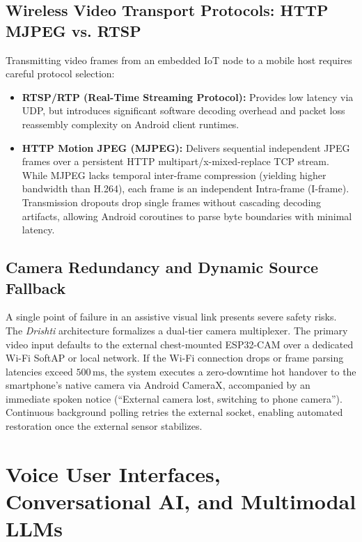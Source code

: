 \documentclass[10pt,twocolumn]{article}
\begin{document}
\subsection{Wireless Video Transport Protocols: HTTP MJPEG vs. RTSP}
Transmitting video frames from an embedded IoT node to a mobile host requires careful protocol selection:
\begin{itemize}[leftmargin=*]
    \item \textbf{RTSP/RTP (Real-Time Streaming Protocol):} Provides low latency via UDP, but introduces significant software decoding overhead and packet loss reassembly complexity on Android client runtimes.
    \item \textbf{HTTP Motion JPEG (MJPEG):} Delivers sequential independent JPEG frames over a persistent HTTP multipart/x-mixed-replace TCP stream. While MJPEG lacks temporal inter-frame compression (yielding higher bandwidth than H.264), each frame is an independent Intra-frame (I-frame). Transmission dropouts drop single frames without cascading decoding artifacts, allowing Android coroutines to parse byte boundaries with minimal latency.
\end{itemize}

\subsection{Camera Redundancy and Dynamic Source Fallback}
A single point of failure in an assistive visual link presents severe safety risks. The \textit{Drishti} architecture formalizes a dual-tier camera multiplexer. The primary video input defaults to the external chest-mounted ESP32-CAM over a dedicated Wi-Fi SoftAP or local network. If the Wi-Fi connection drops or frame parsing latencies exceed $500\,\text{ms}$, the system executes a zero-downtime hot handover to the smartphone's native camera via Android CameraX, accompanied by an immediate spoken notice (``External camera lost, switching to phone camera''). Continuous background polling retries the external socket, enabling automated restoration once the external sensor stabilizes.

\section{Voice User Interfaces, Conversational AI, and Multimodal LLMs}
\label{sec:vui_mllm}
\end{document}
